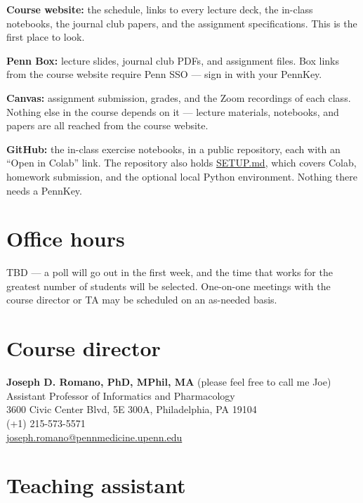\documentclass[11pt]{article}
\begin{document}
\textbf{Course website:} the schedule, links to every lecture deck, the in-class notebooks, the
journal club papers, and the assignment specifications. This is the first place to look.

\textbf{Penn Box:} lecture slides, journal club PDFs, and assignment files. Box links from the
course website require Penn SSO --- sign in with your PennKey.

\textbf{Canvas:} assignment submission, grades, and the Zoom recordings of each class. Nothing
else in the course depends on it --- lecture materials, notebooks, and papers are all reached
from the course website.

\textbf{GitHub:} the in-class exercise notebooks, in a public repository, each with an ``Open in
Colab'' link. The repository also holds
\href{https://github.com/RomanoLab/bmin5200/blob/main/SETUP.md}{SETUP.md}, which covers Colab,
homework submission, and the optional local Python environment. Nothing there needs a PennKey.

\section{Office hours}

TBD --- a poll will go out in the first week, and the time that works for the greatest number of
students will be selected. One-on-one meetings with the course director or TA may be scheduled on
an as-needed basis.

\section{Course director}

\textbf{Joseph D. Romano, PhD, MPhil, MA} (please feel free to call me Joe)\\
Assistant Professor of Informatics and Pharmacology\\
3600 Civic Center Blvd, 5E 300A, Philadelphia, PA 19104\\
(+1) 215-573-5571\\
\href{mailto:joseph.romano@pennmedicine.upenn.edu}{joseph.romano@pennmedicine.upenn.edu}

\section{Teaching assistant}
\end{document}
